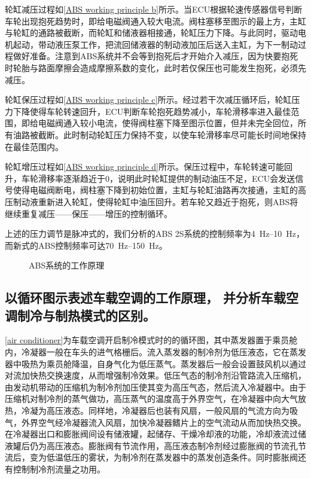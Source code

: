 \documentclass[UTF8]{ctexart}
\numberwithin{figure}{section}
\numberwithin{table}{section}
\begin{document}
轮缸减压过程如\cref{ABS working principle b}所示。当ECU根据轮速传感器信号判断车轮出现抱死趋势时，即给电磁阀通入较大电流。阀柱塞移至图示的最上方，主缸与轮缸的通路被截断，而轮缸和储液器相接通，轮缸压力下降。与此同时，驱动电机起动，带动液压泵工作，把流回储液器的制动液加压后送入主缸，为下一制动过程做好准备。注意到ABS系统并不会等到抱死后才开始介入减压，因为快要抱死时轮胎与路面摩擦会造成摩擦系数的变化，此时若仅保压也可能发生抱死，必须先减压。

轮缸保压过程如\cref{ABS working principle c}所示。经过若干次减压循环后，轮缸压力下降使得车轮转速回升，ECU判断车轮抱死趋势减小，车轮滑移率进入最佳范围，即给电磁阀通入较小电流，使得阀柱塞下降至图示位置，但并未完全回位，所有油路被截断。此时制动轮缸压力保持不变，以使车轮滑移率尽可能长时间地保持在最佳范围内。

轮缸增压过程如\cref{ABS working principle d}所示。保压过程中，车轮转速可能回升，车轮滑移率逐渐趋近于0，说明此时轮缸提供的制动油压不足，ECU会发送信号使得电磁阀断电，阀柱塞下降到初始位置，主缸与轮缸油路再次接通，主缸的高压制动液重新进入轮缸，使得轮缸中油压回升。若车轮又趋近于抱死，则ABS将继续重复减压——保压——增压的控制循环。

上述的压力调节是脉冲式的，我们分析的ABS 2S系统的控制频率为\qtyrange[range-phrase = $\,\sim\,$, range-units = single]{4}{10}{\Hz}，而新式的ABS控制频率可达\qtyrange[range-phrase = $\,\sim\,$, range-units = single]{70}{150}{\Hz}。

\begin{figure}[htbp]
	\centering
	\caption{ABS系统的工作原理}
	\label{ABS working principle}
\end{figure}

\subsection{以循环图示表述车载空调的工作原理， 并分析车载空调制冷与制热模式的区别。}

\cref{air conditioner}为车载空调开启制冷模式时的的循环图，其中蒸发器置于乘员舱内，冷凝器一般在车头的进气格栅后。流入蒸发器的制冷剂为低压液态，它在蒸发器中吸热为乘员舱降温，自身气化为低压蒸气。蒸发器后一般会设置鼓风机以通过对流加快热交换速度，从而增强制冷效果。低压气态的制冷剂沿管路流入压缩机，由发动机带动的压缩机为制冷剂加压使其变为高压气态，然后流入冷凝器中。由于压缩机对制冷剂的蒸气做功，高压蒸气的温度高于外界空气，在冷凝器中向大气放热，冷凝为高压液态。同样地，冷凝器后也装有风扇，一般风扇的气流方向为吸气，外界空气经冷凝器流入风扇，加快冷凝器鳍片上的空气流动从而加快热交换。在冷凝器出口和膨胀阀间设有储液罐，起储存、干燥冷却液的功能，冷却液流过储液罐后仍为高压液态。膨胀阀有节流作用，高压液态制冷剂经过膨胀阀的节流孔节流后，变为低温低压的雾状，为制冷剂在蒸发器中的蒸发创造条件。同时膨胀阀还有控制制冷剂流量之功用。
\end{document}
